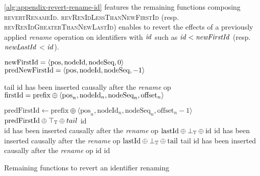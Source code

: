 \label{app:revert-rename-id}

\autoref{alg:appendix-revert-rename-id} features the remaining functions composing \textsc{revertRenameId}.
\textsc{revRenIdLessThanNewFirstId} (resp. \textsc{revRenIdGreaterThanNewLastId}) enables to revert the effects of a previously applied \emph{rename} operation on identifiers with $\mathit{id}$ such as $\mathit{id} < \mathit{newFirstId}$ (resp. $\mathit{newLastId}$ < $\mathit{id}$).

\begin{algorithm}[!ht]
  \footnotesize
  \begin{algorithmic}[1]
        \Statex \Comment $\text{newFirstId} = \langle \text{pos},\text{nodeId},\text{nodeSeq},0 \rangle$
        \Statex \Comment $\text{predNewFirstId} = \langle \text{pos},\text{nodeId},\text{nodeSeq},-1 \rangle$

                  \State \Return tail
              \Else
                  \Statex \Comment id has been inserted causally after the \emph{rename} op
                  \Statex \Comment $\text{firstId} = \text{prefix} \oplus \langle \text{pos}_{n},\text{nodeId}_{n},\text{nodeSeq}_{n},\text{offset}_{n} \rangle$

                  \State $\text{predFirstId} \gets \text{prefix} \oplus \langle \text{pos}_n,\text{nodeId}_n,\text{nodeSeq}_n,\text{offset}_n - 1 \rangle$
                  \State \Return $\text{predFirstId} \oplus \top_\mathbb{T} \oplus tail$ \Comment \commenttopt
              \EndIf
          \Else
              \State \Return id
          \EndIf
      \EndFunction
      \\
              \Statex \Comment id has been inserted causally after the \emph{rename} op
              \State \Return $\text{lastId} \oplus \bot_\mathbb{T} \oplus \text{id}$ \Comment \commentbott
                  \Statex \Comment id has been inserted causally after the \emph{rename} op
                  \State \Return $\text{lastId} \oplus \bot_\mathbb{T} \oplus \text{tail}$ \Comment \commentbott
                  \State \Return tail
              \Else
                  \Statex \Comment id has been inserted causally after the \emph{rename} op
                  \State \Return id
              \EndIf
          \Else
              \State \Return id
          \EndIf
      \EndFunction
  \end{algorithmic}
  \caption{Remaining functions to revert an identifier renaming}
  \label{alg:appendix-revert-rename-id}
\end{algorithm}

